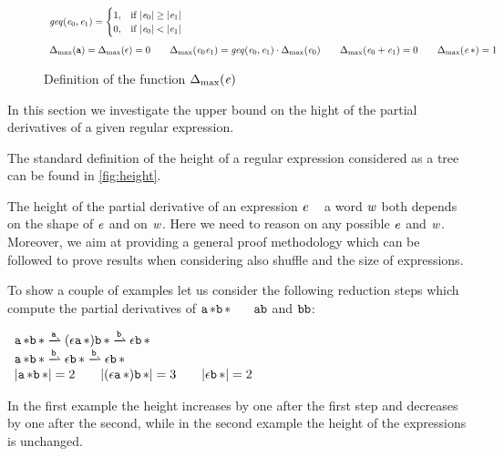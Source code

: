 \begin{figure}
 $$
  \begin{array}{l}
   \mathit{geq}({\mathit {e}_0},{\mathit {e}_1})=
   \begin{cases}
    1, & \text{if } {\mid}{\ensuremath{\mathit {e}}_0}{\mid} \geq {\mid}{\ensuremath{\mathit {e}}_1}{\mid} \\
    0, & \text{if } {\mid}{\ensuremath{\mathit {e}}_0}{\mid} < {\mid}{\mathit {e}_1}{\mid}
   \end{cases} \\[4ex]
   {\Delta_{\max}}({\mathtt {a}})={\Delta_{\max}}({\mathtt {\epsilon}})=0                                      \qquad
   {\Delta_{\max}}({\mathit {e}_0\mathit {e}_1})=\mathit{geq}({\mathit {e}_0},{\mathit {e}_1})\cdot{\Delta_{\max}}({\mathit {e}_0}) \qquad
   {\Delta_{\max}}({\mathit {e}_0\mathbin{+}\mathit {e}_1})=0                                         \qquad
   {\Delta_{\max}}({{{\mathit {e}}\mathop{*}}})=1
  \end{array}
 $$
 \caption{Definition of the function ${\Delta_{\max}}({\mathit {e}})$}
 \label{fig:incFun}
\end{figure}

In this section we investigate the upper bound on the hight of the partial derivatives of a given regular expression.

The standard definition of the height of a regular expression considered as a tree can be found in \cref{fig:height}.

The height of the partial derivative of an expression $\mathit {e}$  \wrt~ a word $\mathit {w}$ both depends on the shape of $\mathit {e}$ and on $\mathit {w}$.
Here we need to reason on any possible $\mathit {e}$ and $\mathit {w}$. Moreover, we aim at providing a general proof methodology which can be followed to prove results when considering also shuffle and the size of expressions.

To show a couple of examples let us consider the following reduction steps which compute the partial derivatives of ${{\mathtt {a}}\mathop{*}}{{\mathtt {b}}\mathop{*}}$~
\wrt~ $\mathtt {a}\mathtt {b}$ and $\mathtt {b}\mathtt {b}$:
\begin{flushleft}
 $
  \begin{array}{l}
   \starop{\sym}\catop\starop{\asym}\parDer{\sym}(\eps\catop\starop{\sym})\catop\starop{\asym}\parDer{\asym}\eps\catop\starop{\asym} \\
   \starop{\sym}\catop\starop{\asym}\parDer{\asym}\eps\catop\starop{\asym}\parDer{\asym}\eps\catop\starop{\asym}                     \\
   \theight{\starop{\sym}\catop\starop{\asym}}=2\qquad \theight{(\eps\catop\starop{\sym})\catop\starop{\asym}}=3 \qquad \theight{\eps\catop\starop{\asym}}=2
  \end{array}
 $
\end{flushleft}
In the first example the height increases by one after the first step and decreases by one after the second, while in the second example the height of the expressions is unchanged.

